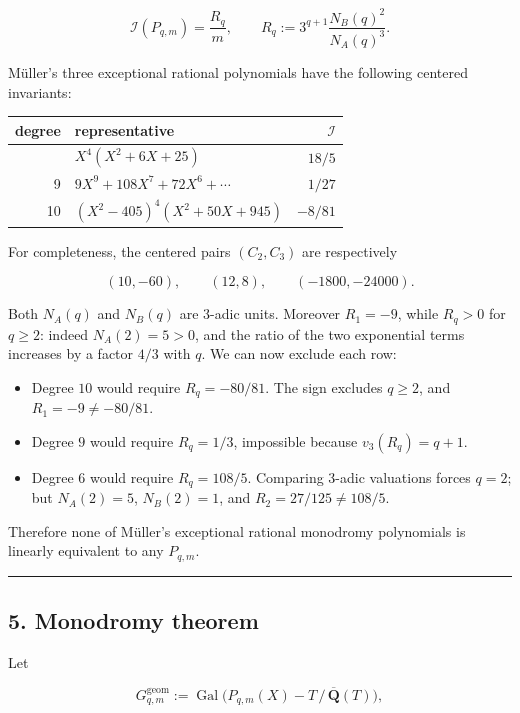 \documentclass[11pt]{article}
\theoremstyle{keio}
\theoremstyle{definition}
\theoremstyle{remark}
\providecommand{\tightlist}{\setlength{\itemsep}{0pt}\setlength{\parskip}{0pt}}
\begin{document}
\[
 \mathcal I(P_{q,m})=\frac{R_q}{m},
 \qquad
 R_q:=3^{q+1}\frac{N_B(q)^2}{N_A(q)^3}.
\]

Müller's three exceptional rational polynomials have the following centered
invariants:

\begin{longtable}[]{@{}rlr@{}}
\toprule\noalign{}
degree & representative & \(\mathcal I\) \\
\midrule\noalign{}
\endhead
\bottomrule\noalign{}
\endlastfoot
6 & \(X^4(X^2+6X+25)\) & \(18/5\) \\
9 & \(9X^9+108X^7+72X^6+\cdots\) & \(1/27\) \\
10 & \((X^2-405)^4(X^2+50X+945)\) & \(-8/81\) \\
\end{longtable}

For completeness, the centered pairs \((C_2,C_3)\) are respectively

\[
 (10,-60),\qquad(12,8),\qquad(-1800,-24000).
\]

Both \(N_A(q)\) and \(N_B(q)\) are 3-adic units. Moreover \(R_1=-9\),
while \(R_q>0\) for \(q\geq2\): indeed \(N_A(2)=5>0\), and the ratio of
the two exponential terms increases by a factor \(4/3\) with \(q\). We can
now exclude each row:

\begin{itemize}
\tightlist
\item
  Degree \(10\) would require \(R_q=-80/81\). The sign excludes
  \(q\geq2\), and \(R_1=-9\ne-80/81\).
\item
  Degree \(9\) would require \(R_q=1/3\), impossible because
  \(v_3(R_q)=q+1\).
\item
  Degree \(6\) would require \(R_q=108/5\). Comparing 3-adic valuations
  forces \(q=2\); but \(N_A(2)=5\), \(N_B(2)=1\), and
  \(R_2=27/125\ne108/5\).
\end{itemize}

Therefore none of Müller's exceptional rational monodromy polynomials is
linearly equivalent to any \(P_{q,m}\).

\begin{center}\rule{0.5\linewidth}{0.5pt}\end{center}

\subsection{5. Monodromy theorem}

Let

\[
 G^{\mathrm{geom}}_{q,m}
 :=\operatorname {Gal}
 \bigl(P_{q,m}(X)-T\,/\,\overline{\mathbf Q}(T)\bigr),
\]
\end{document}
